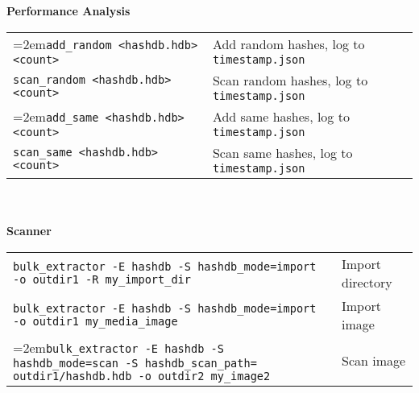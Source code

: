 \begin{footnotesize}
\\
\\
\textbf{Performance Analysis}\\
\begin{tabular}{p{3.6 in} p{4 in}}
\hangindent=2em\texttt{add\_random <hashdb.hdb> <count>} & Add random hashes, log to \texttt{timestamp.json}\\
\texttt{scan\_random <hashdb.hdb> <count>} & Scan random hashes, log to \texttt{timestamp.json}\\
\hangindent=2em\texttt{add\_same <hashdb.hdb> <count>} & Add same hashes, log to \texttt{timestamp.json}\\
\texttt{scan\_same <hashdb.hdb> <count>} & Scan same hashes, log to \texttt{timestamp.json}\\
\end{tabular}
\\
\\
\textbf{\bulk Scanner}\\
\begin{tabular}{p{5.6 in} p{2 in}}
\texttt{bulk\_extractor -E hashdb -S hashdb\_mode=import -o outdir1 -R my\_import\_dir} & Import directory\\
\texttt{bulk\_extractor -E hashdb -S hashdb\_mode=import -o outdir1 my\_media\_image} & Import image\\
\hangindent=2em\texttt{bulk\_extractor -E hashdb -S hashdb\_mode=scan -S hashdb\_scan\_path= outdir1/hashdb.hdb -o outdir2 my\_image2} & Scan image\\
\end{tabular}
\end{footnotesize}

